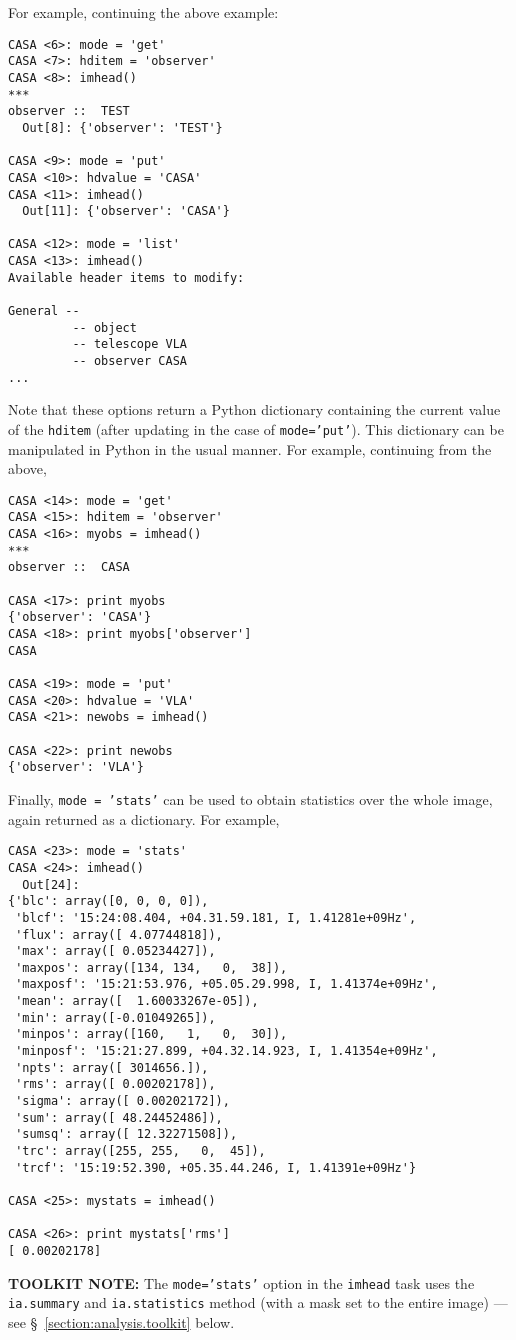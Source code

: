 For example, continuing the above example:
\small
\begin{verbatim}
CASA <6>: mode = 'get'
CASA <7>: hditem = 'observer'
CASA <8>: imhead()
***
observer ::  TEST
  Out[8]: {'observer': 'TEST'}

CASA <9>: mode = 'put'
CASA <10>: hdvalue = 'CASA'
CASA <11>: imhead()
  Out[11]: {'observer': 'CASA'}

CASA <12>: mode = 'list'
CASA <13>: imhead()
Available header items to modify:

General --
         -- object  
         -- telescope VLA
         -- observer CASA
...
\end{verbatim}
\normalsize
Note that these options return a Python
dictionary containing the current value of the {\tt hditem}
(after updating in the case of {\tt mode='put'}).  This
dictionary can be manipulated in Python in the usual manner.
For example, continuing from the above,
\small
\begin{verbatim}
CASA <14>: mode = 'get'
CASA <15>: hditem = 'observer'
CASA <16>: myobs = imhead()
***
observer ::  CASA

CASA <17>: print myobs
{'observer': 'CASA'}
CASA <18>: print myobs['observer']
CASA

CASA <19>: mode = 'put'
CASA <20>: hdvalue = 'VLA'
CASA <21>: newobs = imhead()

CASA <22>: print newobs
{'observer': 'VLA'}

\end{verbatim}
\normalsize

Finally, {\tt mode = 'stats'} can be used to obtain statistics over
the whole image, again returned as a dictionary.  For example,
\small
\begin{verbatim}
CASA <23>: mode = 'stats'
CASA <24>: imhead()
  Out[24]: 
{'blc': array([0, 0, 0, 0]),
 'blcf': '15:24:08.404, +04.31.59.181, I, 1.41281e+09Hz',
 'flux': array([ 4.07744818]),
 'max': array([ 0.05234427]),
 'maxpos': array([134, 134,   0,  38]),
 'maxposf': '15:21:53.976, +05.05.29.998, I, 1.41374e+09Hz',
 'mean': array([  1.60033267e-05]),
 'min': array([-0.01049265]),
 'minpos': array([160,   1,   0,  30]),
 'minposf': '15:21:27.899, +04.32.14.923, I, 1.41354e+09Hz',
 'npts': array([ 3014656.]),
 'rms': array([ 0.00202178]),
 'sigma': array([ 0.00202172]),
 'sum': array([ 48.24452486]),
 'sumsq': array([ 12.32271508]),
 'trc': array([255, 255,   0,  45]),
 'trcf': '15:19:52.390, +05.35.44.246, I, 1.41391e+09Hz'}

CASA <25>: mystats = imhead()

CASA <26>: print mystats['rms']
[ 0.00202178]

\end{verbatim}
\normalsize
{\bf TOOLKIT NOTE:} The {\tt mode='stats'} option in the {\tt imhead}
task uses the {\tt ia.summary} and {\tt ia.statistics} method
(with a mask set to the entire image) --- 
see \S~\ref{section:analysis.toolkit} below.

